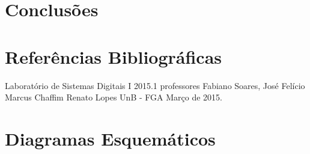 \documentclass[12pts]{article}
\begin{document}
\section{Conclusões}

\section{Referências Bibliográficas}

Laboratório de Sistemas Digitais I 2015.1 professores Fabiano Soares, 
José Felício Marcus Chaffim Renato Lopes UnB - FGA Março de 2015.

\section{Diagramas Esquemáticos}

\newpage
\end{document}
